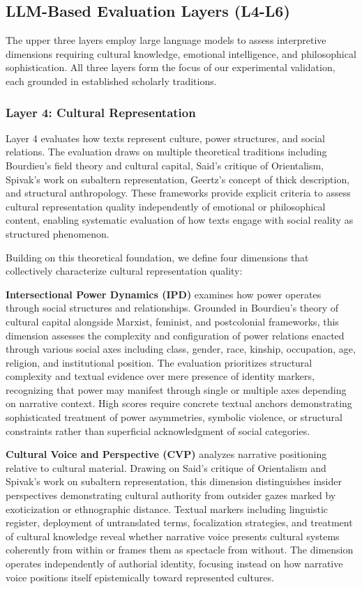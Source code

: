 \subsection{LLM-Based Evaluation Layers (L4-L6)}

The upper three layers employ large language models to assess interpretive dimensions requiring cultural knowledge, emotional intelligence, and philosophical sophistication. All three layers form the focus of our experimental validation, each grounded in established scholarly traditions.

\subsubsection{Layer 4: Cultural Representation}

Layer 4 evaluates how texts represent culture, power structures, and social relations. The evaluation draws on multiple theoretical traditions including Bourdieu's field theory and cultural capital, Said's critique of Orientalism, Spivak's work on subaltern representation, Geertz's concept of thick description, and structural anthropology. These frameworks provide explicit criteria to assess cultural representation quality independently of emotional or philosophical content, enabling systematic evaluation of how texts engage with social reality as structured phenomenon.

Building on this theoretical foundation, we define four dimensions that collectively characterize cultural representation quality:

\textbf{Intersectional Power Dynamics (IPD)} examines how power operates through social structures and relationships. Grounded in Bourdieu's theory of cultural capital alongside Marxist, feminist, and postcolonial frameworks, this dimension assesses the complexity and configuration of power relations enacted through various social axes including class, gender, race, kinship, occupation, age, religion, and institutional position. The evaluation prioritizes structural complexity and textual evidence over mere presence of identity markers, recognizing that power may manifest through single or multiple axes depending on narrative context. High scores require concrete textual anchors demonstrating sophisticated treatment of power asymmetries, symbolic violence, or structural constraints rather than superficial acknowledgment of social categories.

\textbf{Cultural Voice and Perspective (CVP)} analyzes narrative positioning relative to cultural material. Drawing on Said's critique of Orientalism and Spivak's work on subaltern representation, this dimension distinguishes insider perspectives demonstrating cultural authority from outsider gazes marked by exoticization or ethnographic distance. Textual markers including linguistic register, deployment of untranslated terms, focalization strategies, and treatment of cultural knowledge reveal whether narrative voice presents cultural systems coherently from within or frames them as spectacle from without. The dimension operates independently of authorial identity, focusing instead on how narrative voice positions itself epistemically toward represented cultures.

